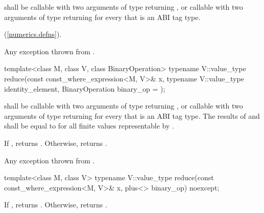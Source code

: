 \begin{wgText}
\begin{itemdescr}
  \pnum\requires
   shall be callable with two arguments of type  returning , or callable with two arguments of type  returning  for every  that is an ABI tag type.

  \pnum\returns
   \foralli (\ref{numerics.defns}).

  \pnum\throws
  Any exception thrown from .

\end{itemdescr}

\begin{itemdecl}
template<class M, class V, class BinaryOperation>
  typename V::value_type reduce(const const_where_expression<M, V>& x,
                                typename V::value_type identity_element,
                                BinaryOperation binary_op = {});
\end{itemdecl}

\begin{itemdescr}
  \pnum\requires
   shall be callable with two arguments of type  returning , or callable with two arguments of type  returning  for every  that is an ABI tag type. The results of  and  shall be equal to  for all finite values  representable by .

  \pnum\returns
  If , returns . Otherwise, returns  \forallmaskedi.

  \pnum\throws
  Any exception thrown from .
\end{itemdescr}

\begin{itemdecl}
template<class M, class V>
  typename V::value_type reduce(const const_where_expression<M, V>& x, plus<> binary_op) noexcept;
\end{itemdecl}

\begin{itemdescr}
  \pnum\returns
  If , returns . Otherwise, returns  \forallmaskedi.
\end{itemdescr}


\end{wgText}
